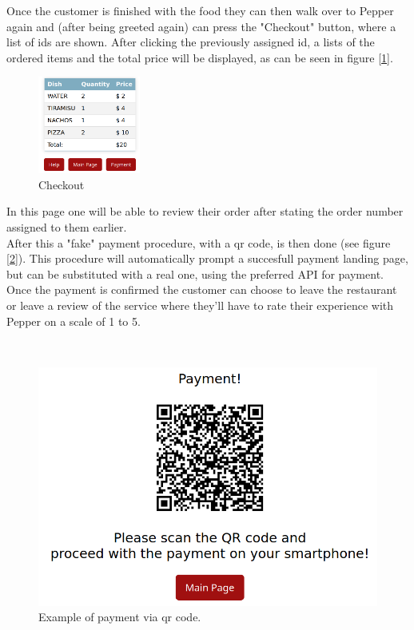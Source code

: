 \documentclass[12pt, letterpaper, twoside]{article}
\begin{document}
Once the customer is finished with the food they can then walk over to Pepper again and (after being greeted again) can press the "Checkout" button, where a list of ids are shown. After clicking the previously assigned id, a lists of the ordered items and the total price will be displayed, as can be seen in figure [\ref{fig:checkout}].\\
\begin{figure}
	\vspace{-40pt}
	\begin{center}
	  \includegraphics[width=0.3\textwidth]{img/checkout.png}
	\end{center}
	\caption{Checkout}
	\label{fig:checkout}
\end{figure}
In this page one will be able to review their order after stating the order number assigned to them earlier. \\
After this a "fake" payment procedure, with a qr code, is then done (see figure [\ref{fig:qr_code}]). This procedure will automatically prompt a succesfull payment landing page, but can be substituted with a real one, using the preferred API for payment. Once the payment is confirmed the customer can choose to leave the restaurant or leave a review of the service where they'll have to rate their experience with Pepper on a scale of 1 to 5. 

\

\begin{figure}[h]
	\centerline{\includegraphics[scale=.3]{img/qr_code.png}}
	\caption{Example of payment via qr code.}
	\label{fig:qr_code}
\end{figure}
\end{document}
